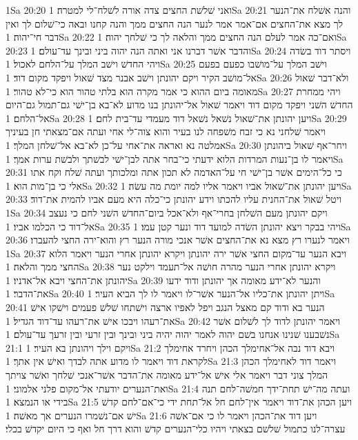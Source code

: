 1Sa 20:20  ואני שׁלשׁת החצים צדה אורה לשׁלח־לי למטרה׃
1Sa 20:21  והנה אשׁלח את־הנער לך מצא את־החצים אם־אמר אמר לנער הנה החצים ממך והנה קחנו ובאה כי־שׁלום לך ואין דבר חי־יהוה׃
1Sa 20:22  ואם־כה אמר לעלם הנה החצים ממך והלאה לך כי שׁלחך יהוה׃
1Sa 20:23  והדבר אשׁר דברנו אני ואתה הנה יהוה ביני ובינך עד־עולם׃
1Sa 20:24  ויסתר דוד בשׂדה ויהי החדשׁ וישׁב המלך על־הלחם לאכול׃
1Sa 20:25  וישׁב המלך על־מושׁבו כפעם בפעם אל־מושׁב הקיר ויקם יהונתן וישׁב אבנר מצד שׁאול ויפקד מקום דוד׃
1Sa 20:26  ולא־דבר שׁאול מאומה ביום ההוא כי אמר מקרה הוא בלתי טהור הוא כי־לא טהור׃
1Sa 20:27  ויהי ממחרת החדשׁ השׁני ויפקד מקום דוד ויאמר שׁאול אל־יהונתן בנו מדוע לא־בא בן־ישׁי גם־תמול גם־היום אל־הלחם׃
1Sa 20:28  ויען יהונתן את־שׁאול נשׁאל נשׁאל דוד מעמדי עד־בית לחם׃
1Sa 20:29  ויאמר שׁלחני נא כי זבח משׁפחה לנו בעיר והוא צוה־לי אחי ועתה אם־מצאתי חן בעיניך אמלטה נא ואראה את־אחי על־כן לא־בא אל־שׁלחן המלך׃
1Sa 20:30  ויחר־אף שׁאול ביהונתן ויאמר לו בן־נעות המרדות הלוא ידעתי כי־בחר אתה לבן־ישׁי לבשׁתך ולבשׁת ערות אמך׃
1Sa 20:31  כי כל־הימים אשׁר בן־ישׁי חי על־האדמה לא תכון אתה ומלכותך ועתה שׁלח וקח אתו אלי כי בן־מות הוא׃
1Sa 20:32  ויען יהונתן את־שׁאול אביו ויאמר אליו למה יומת מה עשׂה׃
1Sa 20:33  ויטל שׁאול את־החנית עליו להכתו וידע יהונתן כי־כלה היא מעם אביו להמית את־דוד׃
1Sa 20:34  ויקם יהונתן מעם השׁלחן בחרי־אף ולא־אכל ביום־החדשׁ השׁני לחם כי נעצב אל־דוד כי הכלמו אביו׃
1Sa 20:35  ויהי בבקר ויצא יהונתן השׂדה למועד דוד ונער קטן עמו׃
1Sa 20:36  ויאמר לנערו רץ מצא נא את־החצים אשׁר אנכי מורה הנער רץ והוא־ירה החצי להעברו׃
1Sa 20:37  ויבא הנער עד־מקום החצי אשׁר ירה יהונתן ויקרא יהונתן אחרי הנער ויאמר הלוא החצי ממך והלאה׃
1Sa 20:38  ויקרא יהונתן אחרי הנער מהרה חושׁה אל־תעמד וילקט נער יהונתן את־החצי ויבא אל־אדניו׃
1Sa 20:39  והנער לא־ידע מאומה אך יהונתן ודוד ידעו את־הדבר׃
1Sa 20:40  ויתן יהונתן את־כליו אל־הנער אשׁר־לו ויאמר לו לך הביא העיר׃
1Sa 20:41  הנער בא ודוד קם מאצל הנגב ויפל לאפיו ארצה וישׁתחו שׁלשׁ פעמים וישׁקו אישׁ את־רעהו ויבכו אישׁ את־רעהו עד־דוד הגדיל׃
1Sa 20:42  ויאמר יהונתן לדוד לך לשׁלום אשׁר נשׁבענו שׁנינו אנחנו בשׁם יהוה לאמר יהוה יהיה ביני ובינך ובין זרעי ובין זרעך עד־עולם׃
1Sa 21:1  ויקם וילך ויהונתן בא העיר׃
1Sa 21:2  ויבא דוד נבה אל־אחימלך הכהן ויחרד אחימלך לקראת דוד ויאמר לו מדוע אתה לבדך ואישׁ אין אתך׃
1Sa 21:3  ויאמר דוד לאחימלך הכהן המלך צוני דבר ויאמר אלי אישׁ אל־ידע מאומה את־הדבר אשׁר־אנכי שׁלחך ואשׁר צויתך ואת־הנערים יודעתי אל־מקום פלני אלמוני׃
1Sa 21:4  ועתה מה־ישׁ תחת־ידך חמשׁה־לחם תנה בידי או הנמצא׃
1Sa 21:5  ויען הכהן את־דוד ויאמר אין־לחם חל אל־תחת ידי כי־אם־לחם קדשׁ ישׁ אם־נשׁמרו הנערים אך מאשׁה׃
1Sa 21:6  ויען דוד את־הכהן ויאמר לו כי אם־אשׁה עצרה־לנו כתמול שׁלשׁם בצאתי ויהיו כלי־הנערים קדשׁ והוא דרך חל ואף כי היום יקדשׁ בכלי׃
